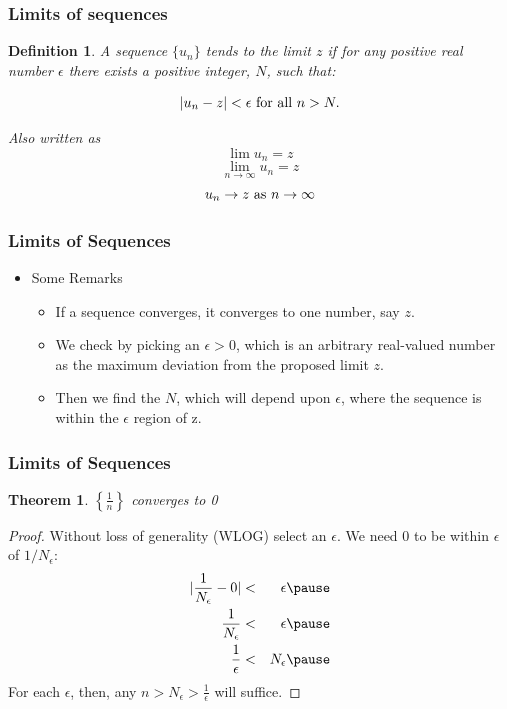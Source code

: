 \documentclass{beamer}
\newtheorem{thm}{Theorem}
\newtheorem{defn}{Definition}
\numberwithin{equation}{section}
\begin{document}
\begin{frame}
\frametitle{Limits of sequences}

\begin{defn}
A sequence $\{ u_{n} \}$ tends to the limit $z$ if for any positive real number $\epsilon$ there exists a positive integer, $N$, such that:

$$|u_n-z|<\epsilon \hbox{ for all }n>N.$$\pause

Also written as  $$\lim u_n=z$$ $$\lim_{n\rightarrow \infty}u_n=z$$ $$u_n\rightarrow z \hbox{ as } n\rightarrow \infty$$
\end{defn}

\end{frame}



\begin{frame}
\frametitle{Limits of Sequences}

\begin{itemize}
\item Some Remarks
\begin{itemize}
\item If a sequence converges, it converges to one number, say $z$. \pause
\item We check by picking an $\epsilon>0$, which is an arbitrary real-valued number as the maximum deviation from the proposed limit $z$. \pause
\item Then we find the $N$, which will depend upon $\epsilon$, where the sequence is within the $\epsilon$ region of z.
\end{itemize}
\end{itemize}

\end{frame}



\begin{frame}
\frametitle{Limits of Sequences}

\begin{thm} $\left\{ \frac{1}{n} \right\}$ converges to 0 
\end{thm} 
\pause
\begin{proof}  Without loss of generality (WLOG) select an $\epsilon$.   We need 0 to be within $\epsilon$ of $1/N_{\epsilon}$:\pause
\begin{eqnarray}
|\frac{ 1} {N_{\epsilon}} - 0 | & < &  \epsilon  \nonumber \pause \\
\frac{1}{N_{\epsilon}} & < & \epsilon \nonumber\pause \\
\frac{1}{\epsilon} & < &  N_{\epsilon} \nonumber \pause
\end{eqnarray}
For each $\epsilon$, then, any $n> N_{\epsilon} > \frac{1}{\epsilon}$ will suffice.
\end{proof}

\end{frame}
\end{document}
